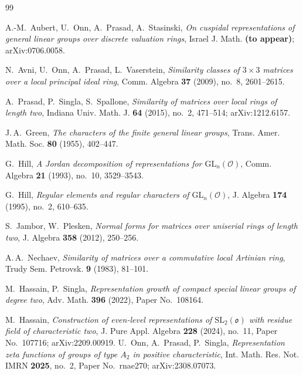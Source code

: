 \documentclass[11pt]{amsart}
\theoremstyle{definition}
\newcommand{\GL}{\mathrm{GL}}
\begin{document}
	
	
	\begin{thebibliography}{99}
		
		 A.-M.\ Aubert, U.\ Onn, A.\ Prasad, A.\ Stasinski,
		\emph{On cuspidal representations of general linear groups over discrete
			valuation rings}, Israel J. Math. \textbf{(to appear)}; arXiv:0706.0058.
		
		 N.\ Avni, U.\ Onn, A.\ Prasad, L.\ Vaserstein,
		\emph{Similarity classes of $3\times 3$ matrices over a local principal
			ideal ring}, Comm. Algebra \textbf{37} (2009), no.\ 8, 2601--2615.
		
		 A.\ Prasad, P.\ Singla, S.\ Spallone, \emph{Similarity of
			matrices over local rings of length two}, Indiana Univ. Math. J.
		\textbf{64} (2015), no.\ 2, 471--514; arXiv:1212.6157.
		
		 J.\,A.\ Green, \emph{The characters of the finite
			general linear groups}, Trans. Amer. Math. Soc. \textbf{80} (1955),
		402--447.
		
		 G.\ Hill, \emph{A Jordan decomposition of representations
			for $\GL_n(\mathcal O)$}, Comm. Algebra \textbf{21} (1993), no.\ 10,
		3529--3543.
		
		 G.\ Hill, \emph{Regular elements and regular characters of
			$\GL_n(\mathcal O)$}, J. Algebra \textbf{174} (1995), no.\ 2, 610--635.
		
		 S.\ Jambor, W.\ Plesken, \emph{Normal forms for matrices
			over uniserial rings of length two}, J. Algebra \textbf{358} (2012),
		250--256.
		
		 A.\,A.\ Nechaev, \emph{Similarity of matrices over a
			commutative local Artinian ring}, Trudy Sem. Petrovsk. \textbf{9} (1983),
		81--101.
		
		 M.\ Hassain, P.\ Singla, \emph{Representation growth of
			compact special linear groups of degree two}, Adv. Math. \textbf{396}
		(2022), Paper No.\ 108164.
		
 M.\ Hassain, \emph{Construction of even-level
	representations of $\mathrm{SL}_2(\mathfrak o)$ with residue field of
	characteristic two}, J. Pure Appl. Algebra \textbf{228} (2024), no.\ 11,
Paper No.\ 107716; arXiv:2209.00919. 
		 U.\ Onn, A.\ Prasad, P.\ Singla, \emph{Representation
			zeta functions of groups of type $A_2$ in positive characteristic},
		Int. Math. Res. Not. IMRN \textbf{2025}, no.\ 2, Paper No.\ rnae270;
		arXiv:2308.07073.
		

\end{thebibliography}
\end{document}
